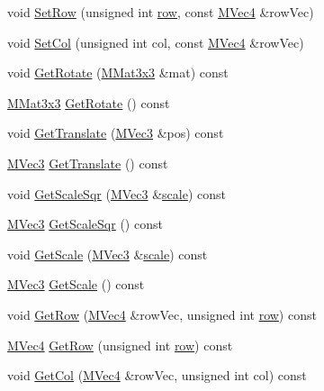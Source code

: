 \begin{CompactItemize}
\item 
void \hyperlink{class_m_mat4x4_2c628c08af200deb17e1bad137bafbaa}{SetRow} (unsigned int \hyperlink{glext__bak_8h_08e0b6bb56b39ff71be380b4cdf5ec33}{row}, const \hyperlink{class_m_vec4}{MVec4} \&rowVec)
\item 
void \hyperlink{class_m_mat4x4_5b94c2756a481355e14a6e040f0a7025}{SetCol} (unsigned int col, const \hyperlink{class_m_vec4}{MVec4} \&rowVec)
\item 
void \hyperlink{class_m_mat4x4_3cc5b3636f8bd790d477e83ad2396007}{GetRotate} (\hyperlink{class_m_mat3x3}{MMat3x3} \&mat) const 
\item 
\hyperlink{class_m_mat3x3}{MMat3x3} \hyperlink{class_m_mat4x4_ba9ccf48a89c2d27effd94d16872cc5f}{GetRotate} () const 
\item 
void \hyperlink{class_m_mat4x4_cb765b649243077af476897147c75919}{GetTranslate} (\hyperlink{class_m_vec3}{MVec3} \&pos) const 
\item 
\hyperlink{class_m_vec3}{MVec3} \hyperlink{class_m_mat4x4_f4ccc5d98e02464db6bb4660851305ad}{GetTranslate} () const 
\item 
void \hyperlink{class_m_mat4x4_1052ad082fcdb2973cf72e661f243834}{GetScaleSqr} (\hyperlink{class_m_vec3}{MVec3} \&\hyperlink{glext__bak_8h_281421b881aa7a1266842b73a3bc7655}{scale}) const 
\item 
\hyperlink{class_m_vec3}{MVec3} \hyperlink{class_m_mat4x4_a58b7792fc25fc7ca9e0822fc7da759f}{GetScaleSqr} () const 
\item 
void \hyperlink{class_m_mat4x4_0315b1a9ce8d06fc297b987a4e7120e4}{GetScale} (\hyperlink{class_m_vec3}{MVec3} \&\hyperlink{glext__bak_8h_281421b881aa7a1266842b73a3bc7655}{scale}) const 
\item 
\hyperlink{class_m_vec3}{MVec3} \hyperlink{class_m_mat4x4_55463466396ea91ce4bfe79bc6bcf110}{GetScale} () const 
\item 
void \hyperlink{class_m_mat4x4_820fe272baaa1085f2e352511efa8b29}{GetRow} (\hyperlink{class_m_vec4}{MVec4} \&rowVec, unsigned int \hyperlink{glext__bak_8h_08e0b6bb56b39ff71be380b4cdf5ec33}{row}) const 
\item 
\hyperlink{class_m_vec4}{MVec4} \hyperlink{class_m_mat4x4_0cc56b3435aedef6d9477249368d4de9}{GetRow} (unsigned int \hyperlink{glext__bak_8h_08e0b6bb56b39ff71be380b4cdf5ec33}{row}) const 
\item 
void \hyperlink{class_m_mat4x4_dfeec8261c165fa894048e082702de36}{GetCol} (\hyperlink{class_m_vec4}{MVec4} \&rowVec, unsigned int col) const 
\item 

\end{CompactItemize}
